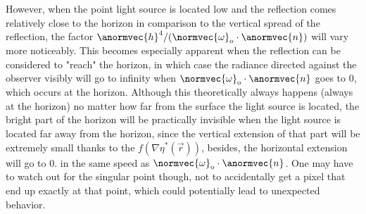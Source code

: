 However, when the point light source is located low and the reflection comes relatively close to the horizon in comparison to the vertical spread of the reflection, the factor $\anormvec{h}^4/(\normvec{\omega}_{\text{o}}\cdot\anormvec{n})$ will vary more noticeably. This becomes especially apparent when the reflection can be considered to "reach" the horizon, in which case the radiance directed against the observer visibly will go to infinity when $\normvec{\omega}_{\text{o}}\cdot\anormvec{n}$ goes to 0, which occurs at the horizon. Although this theoretically always happens (always at the horizon) no matter how far from the surface the light source is located, the bright part of the horizon will be practically invisible when the light source is located far away from the horizon, since the vertical extension of that part will be extremely small thanks to the $f(\nabla\eta^*(\vec{r}))$, besides, the horizontal extension will go to 0. in the same speed as $\normvec{\omega}_{\text{o}}\cdot\anormvec{n}$. One may have to watch out for the singular point though, not to accidentally get a pixel that end up exactly at that point, which could potentially lead to unexpected behavior.